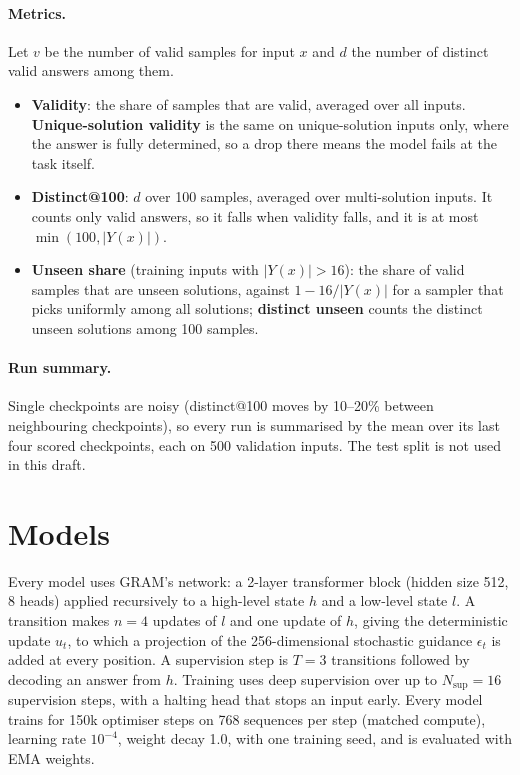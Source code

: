 \documentclass{article}
\newcommand{\Y}{|Y(x)|}
\begin{document}
\paragraph{Metrics.} Let $v$ be the number of valid samples for input $x$ and $d$ the number of distinct valid answers
among them.
\begin{itemize}
  \item \textbf{Validity}: the share of samples that are valid, averaged over all inputs. \textbf{Unique-solution
  validity} is the same on unique-solution inputs only, where the answer is fully determined, so a drop there means
  the model fails at the task itself.
  \item \textbf{Distinct@100}: $d$ over 100 samples, averaged over multi-solution inputs. It counts only valid
  answers, so it falls when validity falls, and it is at most $\min(100,\Y)$.
  \item \textbf{Unseen share} (training inputs with $\Y>16$): the share of valid samples that are unseen solutions,
  against $1-16/\Y$ for a sampler that picks uniformly among all solutions; \textbf{distinct unseen} counts the
  distinct unseen solutions among 100 samples.
\end{itemize}

\paragraph{Run summary.} Single checkpoints are noisy (distinct@100 moves by 10--20\% between neighbouring
checkpoints), so every run is summarised by the mean over its last four scored checkpoints, each on 500 validation
inputs. The test split is not used in this draft.

\section{Models}
\label{sec:models}

Every model uses GRAM's network: a 2-layer transformer block (hidden size 512, 8 heads) applied recursively to a
high-level state $h$ and a low-level state $l$. A transition makes $n=4$ updates of $l$ and one update of $h$, giving
the deterministic update $u_t$, to which a projection of the 256-dimensional stochastic guidance $\epsilon_t$ is added
at every position. A supervision step is $T=3$ transitions followed by decoding an answer from $h$. Training uses deep
supervision over up to $N_{\text{sup}}=16$ supervision steps, with a halting head that stops an input early. Every
model trains for 150k optimiser steps on 768 sequences per step (matched compute), learning rate $10^{-4}$, weight
decay 1.0, with one training seed, and is evaluated with EMA weights.
\end{document}
